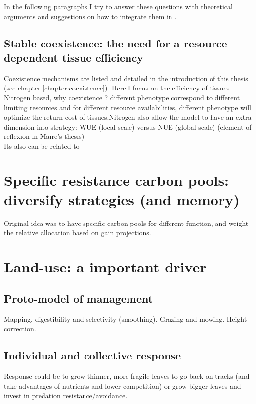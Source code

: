 In the following paragraphs I try to answer these questions with theoretical arguments and suggestions on how to integrate them in \model.

\section{Stable coexistence: the need for a resource dependent tissue efficiency}

Coexistence mechanisms are listed and detailed in the introduction of this thesis (see chapter \ref{chapter:coexistence}). Here I focus on the efficiency of tissues... Nitrogen based, why coexistence ? different phenotype correspond to different limiting resources and for different resource availabilities, different phenotype will optimize the return cost of tissues.Nitrogen also allow the model to have an extra dimension into strategy: WUE (local scale) versus NUE (global scale) (element of reflexion in Maire's thesis).\\
Its also can be related to


\chapter{Specific resistance carbon pools: diversify strategies (and memory)}

Original idea was to have specific carbon pools for different function, and weight the relative allocation based on gain projections.

\chapter{Land-use: a important driver}

\section{Proto-model of management}

Mapping, digestibility and selectivity (smoothing). Grazing and mowing. Height correction.

\section{Individual and collective response}
Response could be to grow thinner, more fragile leaves to go back on tracks (and take advantages of nutrients and lower competition) or grow bigger leaves and invest in predation resistance/avoidance.

